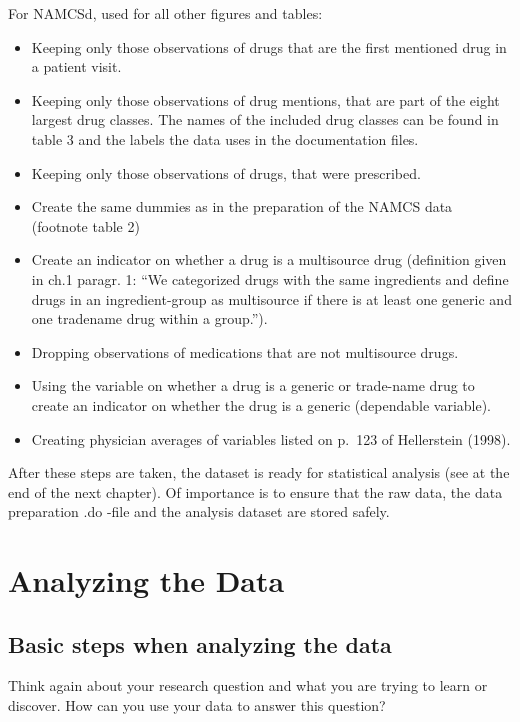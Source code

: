 \documentclass[
]{book}
\providecommand{\tightlist}{%
  \setlength{\itemsep}{0pt}\setlength{\parskip}{0pt}}
\begin{document}
For NAMCSd, used for all other figures and tables:

\begin{itemize}
\tightlist
\item
  Keeping only those observations of drugs that are the first mentioned
  drug in a patient visit.
\item
  Keeping only those observations of drug mentions, that are part of the
  eight largest drug classes. The names of the included drug classes can
  be found in table 3 and the labels the data uses in the documentation
  files.
\item
  Keeping only those observations of drugs, that were prescribed.
\item
  Create the same dummies as in the preparation of the NAMCS data
  (footnote table 2)
\item
  Create an indicator on whether a drug is a multisource drug
  (definition given in ch.1 paragr. 1: ``We categorized drugs with the
  same ingredients and define drugs in an ingredient-group as
  multisource if there is at least one generic and one tradename drug
  within a group.'').
\item
  Dropping observations of medications that are not multisource drugs.
\item
  Using the variable on whether a drug is a generic or trade-name drug
  to create an indicator on whether the drug is a generic (dependable
  variable).
\item
  Creating physician averages of variables listed on p.~123 of
  Hellerstein (1998).
\end{itemize}

After these steps are taken, the dataset is ready for statistical
analysis (see at the end of the next chapter). Of importance is to
ensure that the raw data, the data preparation .do -file and the
analysis dataset are stored safely.

\hypertarget{analyzing}{%
\chapter{Analyzing the Data}\label{analyzing}}

\hypertarget{basic-steps-when-analyzing-the-data}{%
\section{Basic steps when analyzing the
data}\label{basic-steps-when-analyzing-the-data}}

Think again about your research question and what you are trying to
learn or discover. How can you use your data to answer this question?
\end{document}
